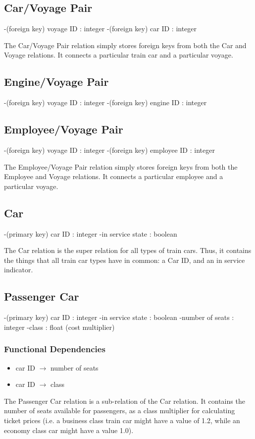 \documentclass[a4paper]{article}
\begin{document}
\subsection*{Car/Voyage Pair}
\begin{itemize}
-(foreign key) voyage ID : integer
-(foreign key) car ID : integer
\end{itemize}
The Car/Voyage Pair relation simply stores foreign keys from both the Car and Voyage relations. It connects a particular train car and a particular voyage.

\subsection*{Engine/Voyage Pair}
\begin{itemize}
-(foreign key) voyage ID : integer
-(foreign key) engine ID : integer
\end{itemize}

\subsection*{Employee/Voyage Pair}
\begin{itemize}
-(foreign key) voyage ID : integer
-(foreign key) employee ID : integer
\end{itemize}
The Employee/Voyage Pair relation simply stores foreign keys from both the Employee and Voyage relations. It connects a particular employee and a particular voyage.

\subsection*{Car}
\begin{itemize}
-(primary key) car ID : integer
-in service state : boolean
\end{itemize}
The Car relation is the super relation for all types of train cars. Thus, it contains the things that all train car types have in common: a Car ID, and an in service indicator.

\subsection*{Passenger Car}
\begin{itemize}
-(primary key) car ID : integer
-in service state : boolean
-number of seats : integer
-class : float (cost multiplier)
\end{itemize}
\subsubsection*{Functional Dependencies}
\begin{itemize}
\item car ID $\rightarrow$ number of seats
\item car ID $\rightarrow$ class
\end{itemize}
The Passenger Car relation is a sub-relation of the Car relation. It contains the number of seats available for passengers, as a class multiplier for calculating ticket prices (i.e. a business class train car might have a value of 1.2, while an economy class car might have a value 1.0).
\end{document}
